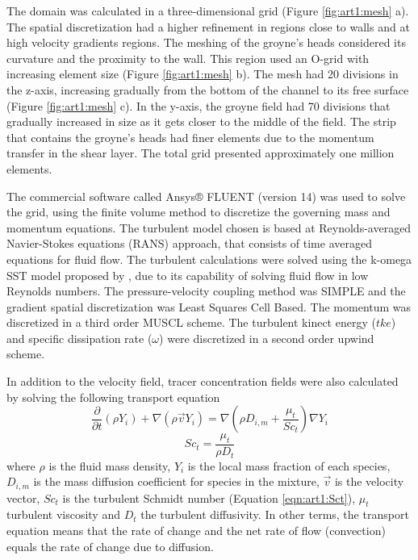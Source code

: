 The domain was calculated in a three-dimensional grid (Figure \ref{fig:art1:mesh} a). The spatial discretization had a higher refinement in regions close to walls and at high velocity gradients regions. The meshing of the groyne’s heads considered its curvature and the proximity to the wall. This region used an O-grid with increasing element size (Figure \ref{fig:art1:mesh} b). The mesh had 20 divisions in the z-axis, increasing gradually from the bottom of the channel to its free surface (Figure \ref{fig:art1:mesh} c). In the y-axis, the groyne field had 70 divisions that gradually increased in size as it gets closer to the middle of the field. The strip that contains the groyne’s heads had finer elements due to the momentum transfer in the shear layer. The total grid presented approximately one million elements.

The commercial software called Ansys® FLUENT (version 14) was used to solve the grid, using the finite volume method to discretize the governing mass and momentum equations. The turbulent model chosen is based at Reynolds-averaged Navier-Stokes equations (RANS) approach, that consists of time averaged equations for fluid flow. The turbulent calculations were solved using the k-omega SST model proposed by \textcite{Menter2005}, due to its capability of solving fluid flow in low Reynolds numbers. The pressure-velocity coupling method was SIMPLE and the gradient spatial discretization was Least Squares Cell Based. The momentum was discretized in a third order MUSCL scheme. The turbulent kinect energy ($tke$) and specific dissipation rate ($\omega$) were discretized in a second order upwind scheme.

In addition to the velocity field, tracer concentration fields were also calculated by solving the following transport equation 
\begin{equation}
\frac{\partial}{\partial t}(\rho Y_i)+\nabla (\rho \vec{v} Y_i)=\nabla (\rho D_{i,m}+\frac{\mu_t}{Sc_t})\nabla Y_i
\label{eqn:art1:transportEq}
\end{equation}\begin{equation}
Sc_t = \frac{\mu_t}{\rho D_t}
\label{eqn:art1:Sct}
\end{equation}
where $\rho$ is the fluid mass density, $Y_i$ is the local mass fraction of each species, $D_{i,m}$ is the mass diffusion coefficient for species in the mixture, $\vec{v}$ is the velocity vector, $Sc_t$ is the turbulent Schmidt number (Equation \ref{eqn:art1:Sct}), $\mu_t$ turbulent viscosity and $D_t$ the turbulent diffusivity. In other terms, the transport equation means that the rate of change and the net rate of flow (convection) equals the rate of change due to diffusion.

